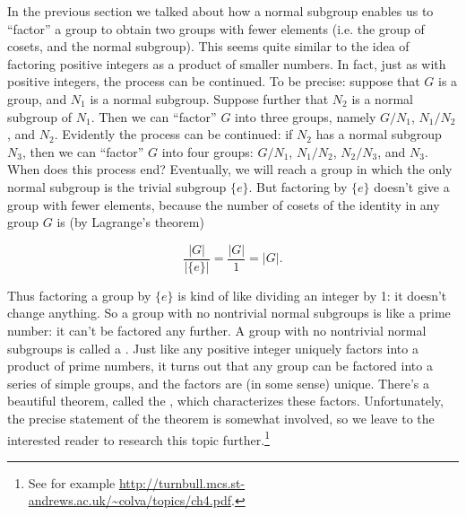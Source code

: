  In the previous section we talked about how a normal subgroup enables us to ``factor'' a group to obtain two groups with fewer elements (i.e. the group of cosets, and the normal subgroup). This seems quite similar to the idea of factoring positive integers as a product of smaller numbers. In fact, just as with positive integers, the process can be continued. To be precise: suppose that $G$ is a group, and $N_1$ is a normal subgroup. Suppose further that $N_2$ is a normal subgroup of $N_1$.  Then we can ``factor'' $G$ into three groups, namely $G/N_1$, $N_1/N_2$, and $N_2$. Evidently the process can be continued: if $N_2$ has a normal subgroup $N_3$, then we can ``factor'' $G$ into four groups: $G/N_1$, $N_1/N_2$, $N_2/N_3$, and $N_3$.  When does this process end? Eventually, we will reach a group in which the only normal subgroup is the trivial subgroup  $\{e\}$.  But factoring by $\{e\}$ doesn't give a group with fewer elements, because the number of cosets of the identity in any group $G$ is (by Lagrange's theorem)

\[ \frac{|G|}{|\{e\}|} = \frac{|G|}{1} = |G|. \]

\noindent
Thus factoring a group by $\{e\}$ is kind of like dividing an integer by 1: it doesn't change anything. So a group with no nontrivial normal subgroups is like a prime number: it can't be factored any further. A group with no nontrivial normal subgroups is called a .  Just like any positive integer uniquely factors into a product of prime numbers,  it turns out that any group can be factored into a series of simple groups, and the factors are (in some sense) unique.  There's a beautiful theorem, called the , which characterizes these factors. Unfortunately, the precise statement of the theorem is somewhat involved, so we leave to the interested reader to research this topic further.\footnote{See for example \url{http://turnbull.mcs.st-andrews.ac.uk/~colva/topics/ch4.pdf}.} 


